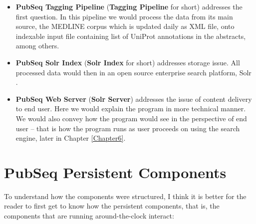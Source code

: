\begin{itemize}
\item \textbf{PubSeq Tagging Pipeline} (\textbf{Tagging Pipeline} for short) addresses the first question. In this pipeline we would process the data from its main source, the MEDLINE corpus which is updated daily as XML file, onto indexable input file containing list of UniProt annotations in the abstracts, among others.
\item \textbf{PubSeq Solr Index} (\textbf{Solr Index} for short) addresses storage issue. All processed data would then in an open source enterprise search platform, Solr \citep{smiley2015apache}.
\item \textbf{PubSeq Web Server} (\textbf{Solr Server}) addresses the issue of content delivery to end user. Here we would explain the program in more technical manner. We would also convey how the program would see in the perspective of end user -- that is how the program runs as user proceeds on using the search engine, later in Chapter \ref{Chapter6}.
\end{itemize}


\section{PubSeq Persistent Components}

To understand how the components were structured, I think it is better for the reader to first get to know how the persistent components, that is, the components that are running around-the-clock interact:

